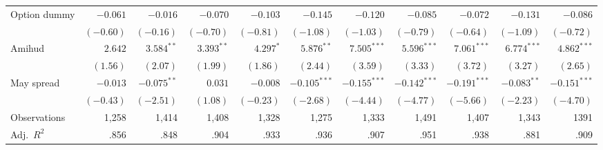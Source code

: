 \documentclass[10pt,a4paper]{article}
\begin{document}
{\begin{longtable}{@{}l*{10}{r}@{}}
Option dummy & $-0.061$ & $-0.016$ & $-0.070$ & $-0.103$ & $-0.145$ & $-0.120$ & $-0.085$ & $-0.072$ & $-0.131$ & $-0.086$\\
 & $(-0.60)$ & $(-0.16)$ & $(-0.70)$ & $(-0.81)$ & $(-1.08)$ & $(-1.03)$ & $(-0.79)$ & $(-0.64)$ & $(-1.09)$ & $(-0.72)$\\
Amihud & $2.642$ & $3.584^{**}$ & $3.393^{**}$ & $4.297^{*}$ & $5.876^{**}$ & $7.505^{***}$ & $5.596^{***}$ & $7.061^{***}$ & $6.774^{***}$ & $4.862^{***}$\\
 & $(1.56)$ & $(2.07)$ & $(1.99)$ & $(1.86)$ & $(2.44)$ & $(3.59)$ & $(3.33)$ & $(3.72)$ & $(3.27)$ & $(2.65)$\\
May spread & $-0.013$ & $-0.075^{**}$ & $0.031$ & $-0.008$ & $-0.105^{***}$ & $-0.155^{***}$ & $-0.142^{***}$ & $-0.191^{***}$ & $-0.083^{**}$ & $-0.151^{***}$\\
 & $(-0.43)$ & $(-2.51)$ & $(1.08)$ & $(-0.23)$ & $(-2.68)$ & $(-4.44)$ & $(-4.77)$ & $(-5.66)$ & $(-2.23)$ & $(-4.70)$\\
Observations & 1,258 & 1,414 & 1,408 & 1,328 & 1,275 & 1,333 & 1,491 & 1,407 & 1,343 & 1391\\
Adj.\ $R^2$ & .856 & .848 & .904 & .933 & .936 & .907 & .951 & .938 & .881 & .909\\
\bottomrule
\end{longtable}}
\end{document}
